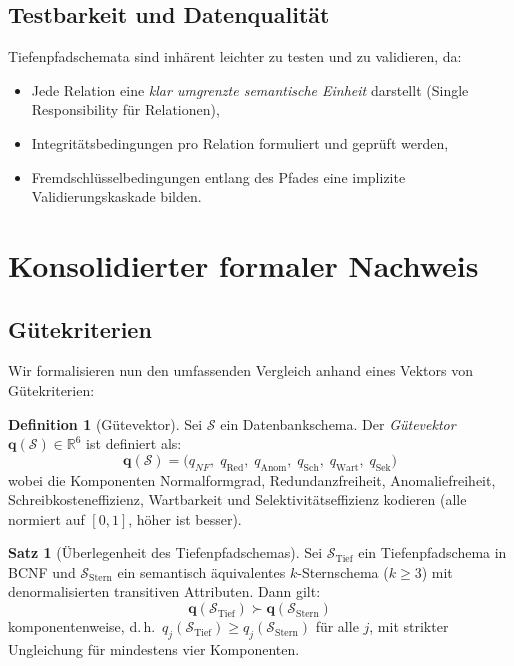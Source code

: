 ﻿\documentclass[a4paper,12pt]{report}
\theoremstyle{definition}
\newtheorem{definition}{Definition}[chapter]
\newtheorem{theorem}{Satz}[chapter]
\theoremstyle{remark}
\newcommand{\NF}{\mathit{NF}}
\begin{document}
\subsection{Testbarkeit und Datenqualität}

Tiefenpfadschemata sind inhärent leichter zu testen und zu validieren,
da:
\begin{itemize}
  \item Jede Relation eine \emph{klar umgrenzte semantische Einheit} darstellt
        (Single Responsibility für Relationen),
  \item Integritätsbedingungen pro Relation formuliert und geprüft werden,
  \item Fremdschlüsselbedingungen entlang des Pfades eine implizite
        Validierungskaskade bilden.
\end{itemize}

\section{Konsolidierter formaler Nachweis}
\label{sec:beweis}

\subsection{Gütekriterien}

Wir formalisieren nun den umfassenden Vergleich anhand eines Vektors von
Gütekriterien:

\begin{definition}[Gütevektor]
Sei $\mathcal{S}$ ein Datenbankschema. Der \emph{Gütevektor}
$\mathbf{q}(\mathcal{S}) \in \mathbb{R}^6$ ist definiert als:
\[
  \mathbf{q}(\mathcal{S}) = \bigl(
    q_{\NF},\; q_{\text{Red}},\; q_{\text{Anom}},\;
    q_{\text{Sch}},\; q_{\text{Wart}},\; q_{\text{Sek}}
  \bigr)
\]
wobei die Komponenten Normalformgrad, Redundanzfreiheit,
Anomaliefreiheit, Schreibkosteneffizienz, Wartbarkeit und
Selektivitätseffizienz kodieren (alle normiert auf $[0,1]$,
höher ist besser).
\end{definition}

\begin{theorem}[Überlegenheit des Tiefenpfadschemas]
\label{thm:hauptsatz}
Sei $\mathcal{S}_{\text{Tief}}$ ein Tiefenpfadschema in BCNF und
$\mathcal{S}_{\text{Stern}}$ ein semantisch äquivalentes $k$-Sternschema
($k \geq 3$) mit denormalisierten transitiven Attributen. Dann gilt:
\[
  \mathbf{q}(\mathcal{S}_{\text{Tief}}) \succ \mathbf{q}(\mathcal{S}_{\text{Stern}})
\]
komponentenweise, d.\,h.\ $q_j(\mathcal{S}_{\text{Tief}}) \geq q_j(\mathcal{S}_{\text{Stern}})$
für alle $j$, mit strikter Ungleichung für mindestens vier Komponenten.
\end{theorem}
\end{document}
